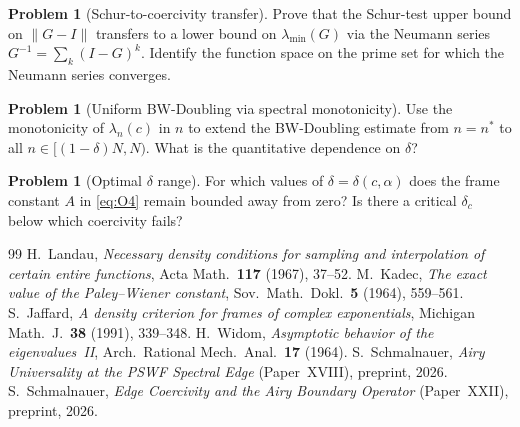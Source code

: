 \documentclass[12pt,a4paper]{amsart}
\theoremstyle{definition}
\newtheorem{problem}[theorem]{Problem}
\begin{document}
\begin{problem}[Schur-to-coercivity transfer]\label{sub1}
Prove that the Schur-test upper bound on $\|G - I\|$
transfers to a lower bound on $\lambda_{\min}(G)$
via the Neumann series $G^{-1} = \sum_k (I-G)^k$.
Identify the function space on the prime set
for which the Neumann series converges.
\end{problem}

\begin{problem}[Uniform BW-Doubling via spectral monotonicity]%
\label{sub2}
Use the monotonicity of $\lambda_n(c)$ in $n$
to extend the BW-Doubling estimate from
$n = n^*$ to all $n \in [(1-\delta)N, N)$.
What is the quantitative dependence on $\delta$?
\end{problem}

\begin{problem}[Optimal $\delta$ range]\label{sub3}
For which values of $\delta = \delta(c, \alpha)$
does the frame constant $A$ in \eqref{eq:O4}
remain bounded away from zero?
Is there a critical $\delta_c$ below which coercivity fails?
\end{problem}

\begin{thebibliography}{99}
H.~Landau,
\textit{Necessary density conditions for sampling
and interpolation of certain entire functions},
Acta Math.\ \textbf{117} (1967), 37--52.
M.~Kadec,
\textit{The exact value of the Paley--Wiener constant},
Sov.\ Math.\ Dokl.\ \textbf{5} (1964), 559--561.
S.~Jaffard,
\textit{A density criterion for frames of complex exponentials},
Michigan Math.\ J.\ \textbf{38} (1991), 339--348.
H.~Widom,
\textit{Asymptotic behavior of the eigenvalues~II},
Arch.\ Rational Mech.\ Anal.\ \textbf{17} (1964).
S.~Schmalnauer,
\textit{Airy Universality at the PSWF Spectral Edge}
(Paper~XVIII), preprint, 2026.
S.~Schmalnauer,
\textit{Edge Coercivity and the Airy Boundary Operator}
(Paper~XXII), preprint, 2026.
\end{thebibliography}
\end{document}
